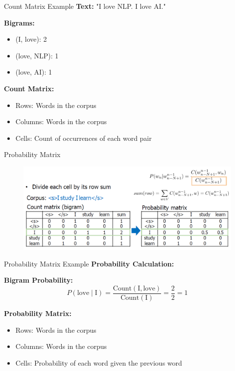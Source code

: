\begin{frame}{Count Matrix Example}
    \textbf{Text:} "I love NLP. I love AI."
    
    \vspace{1em}
    \textbf{Bigrams:}
    \begin{itemize}
        \item (I, love): 2
        \item (love, NLP): 1
        \item (love, AI): 1
    \end{itemize}
    
    \vspace{1em}
    \textbf{Count Matrix:}
    \begin{itemize}
        \item Rows: Words in the corpus
        \item Columns: Words in the corpus
        \item Cells: Count of occurrences of each word pair
    \end{itemize}
\end{frame}

\begin{frame}{Probability Matrix}
    \begin{figure}
        \centering
        \includegraphics[height=0.8\textheight,width=1\textwidth,keepaspectratio]{images/nlp-intro/probability-matrix.png}
    \end{figure}
\end{frame}

\begin{frame}{Probability Matrix Example}
    \textbf{Probability Calculation:}
    
    \vspace{1em}
    \textbf{Bigram Probability:}
    \[
        P(\text{love} \mid \text{I}) = \frac{\text{Count}(\text{I}, \text{love})}{\text{Count}(\text{I})} = \frac{2}{2} = 1
    \]
    
    \vspace{1em}
    \textbf{Probability Matrix:}
    \begin{itemize}
        \item Rows: Words in the corpus
        \item Columns: Words in the corpus
        \item Cells: Probability of each word given the previous word
    \end{itemize}
\end{frame}
